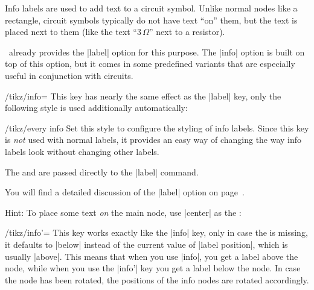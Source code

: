 Info labels are used to add text to a circuit symbol. Unlike normal
nodes like a rectangle, circuit symbols typically do not have text
``on'' them, but the text is placed next to them (like the text
``$3\,\Omega$'' next to a resistor).

\tikzname\ already provides the |label| option for this purpose. The
|info| option is built on top of this option, but it comes in some
predefined variants that are especially useful in conjunction with
circuits.

\begin{key}{/tikz/info=}
  This key has nearly the same effect as the |label| key, only the
  following style is used additionally automatically:
  \begin{stylekey}{/tikz/every info}
    Set this style to configure the styling of info labels. Since this
    key is \emph{not} used with normal labels, it provides an easy way
    of changing the way info labels look without changing other
    labels.
  \end{stylekey}
  The  and  are passed directly to the
  |label| command.
\begin{codeexample}[]
\begin{tikzpicture}[circuit ee IEC,every info/.style=red]
  \node [resistor,info=$3\Omega$] {};
\end{tikzpicture}
\end{codeexample}

  You will find a detailed discussion of the |label| option on
  page~\pageref{label-option}.

  Hint: To place some text \emph{on} the main node, use |center| as
  the :
\begin{codeexample}[]
\end{codeexample}
\end{key}

\begin{key}{/tikz/info'=}
  This key works exactly like the |info| key, only in case the
   is missing, it defaults to |below| instead of the
  current value of  |label position|, which is usually |above|. This
  means that when you use |info|, you get a label above the node,
  while when you use the |info'| key you get a label below the
  node. In case the node has been rotated, the positions of the info
  nodes are rotated accordingly.
\begin{codeexample}[]
\end{codeexample}
\end{key}

